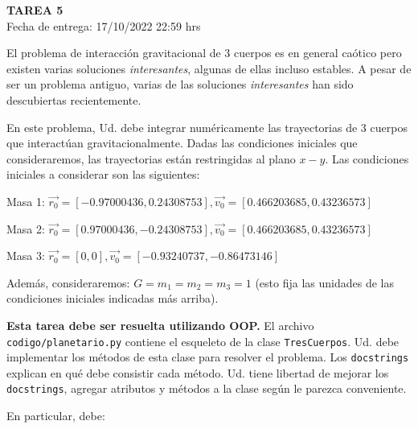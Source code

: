 \documentclass[letter, 11pt]{article}
\newcommand{\tareanro}{5}
\newcommand{\fechaentrega}{17/10/2022 22:59 hrs}
\begin{document}
\thispagestyle{firstpage}

\begin{center}
  {\uppercase{\LARGE \bf Tarea \tareanro}}\\
  Fecha de entrega: \fechaentrega
\end{center}



El problema de interacción gravitacional de 3 cuerpos es en general caótico pero
existen varias soluciones \emph{interesantes}, algunas de ellas incluso
estables. A pesar de ser un problema antiguo, varias de las soluciones
\emph{interesantes} han sido descubiertas recientemente.

En este problema, Ud. debe integrar numéricamente las trayectorias de 3 cuerpos
que interactúan gravitacionalmente. Dadas las condiciones iniciales que
consideraremos, las trayectorias están restringidas al plano $x-y$. Las
condiciones iniciales a considerar son las siguientes:

\vspace{0.5em}
Masa 1:
$\vec{r_0} = [-0.97000436, 0.24308753], \vec{v_0}= [0.466203685, 0.43236573]$ 

Masa 2:
$\vec{r_0} = [0.97000436, -0.24308753], \vec{v_0}= [0.466203685, 0.43236573]$ 

Masa 3:
$\vec{r_0} = [0, 0], \vec{v_0}= [-0.93240737, -0.86473146] $ 

\vspace{0.5em}
Además, consideraremos: $G = m_1 = m_2 = m_3 = 1$ (esto fija las unidades de las
condiciones iniciales indicadas más arriba).

{\bf Esta tarea debe ser resuelta utilizando OOP.} El archivo
\texttt{codigo/planetario.py} contiene el esqueleto de la clase
\texttt{TresCuerpos}. Ud. debe implementar los métodos de esta clase para
resolver el problema. Los \texttt{docstrings} explican en qué debe consistir
cada método. Ud. tiene libertad de mejorar los \texttt{docstrings}, agregar
atributos y métodos a la clase según le parezca conveniente.

En particular, debe:
\end{document}
